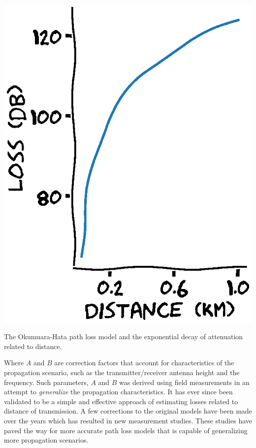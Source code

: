 \begin{marginfigure}
    \centering
    \includegraphics{chapters/part_pathloss/figures/okumura-hata-pathloss.eps}
    \caption{The Okumuara-Hata path loss model and the exponential decay of attenuation related to distance.}
    \label{fig:my_label}
\end{marginfigure}

Where $A$ and $B$ are correction factors that account for characteristics of the propagation scenario, such as the transmitter/receiver antenna height and the frequency. Such parameters, $A$ and $B$ was derived using field measurements in an attempt to \emph{generalize} the propagation characteristics. It has ever since been validated to be a simple and effective approach of estimating losses related to distance of transmission. A few corrections to the original models have been made over the years which has resulted in new measurement studies. These studies have paved the way for more accurate path loss models that is capable of generalizing more propagation scenarios.

